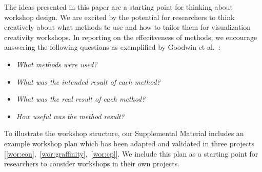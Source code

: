 \begin{tcolorbox}[floatplacement=b,float,title=Getting Creative with Workshop Design]
The ideas presented in this paper are a starting point for thinking about workshop design. We are excited by the potential for researchers to think creatively about what methods to use and how to tailor them for visualization creativity workshops. In reporting on the effecitveness of methods, we encourage answering the following questions as exemplified by Goodwin et al.~\cite{Goodwin2013}:
\begin{itemize}[nolistsep,noitemsep]
\item {\it What methods were used?}
\item {\it What was the intended result of each method?}
\item {\it What was the real result of each method?}
\item {\it How useful was the method result?}
\end{itemize}


To illustrate the workshop structure, our Supplemental Material includes an example workshop plan which has been adapted and validated in three projects [\ref{wor:eon},~\ref{wor:graffinity},~\ref{wor:cp}]. We include this plan as a starting point for researchers to consider workshops in their own projects.
\end{tcolorbox}